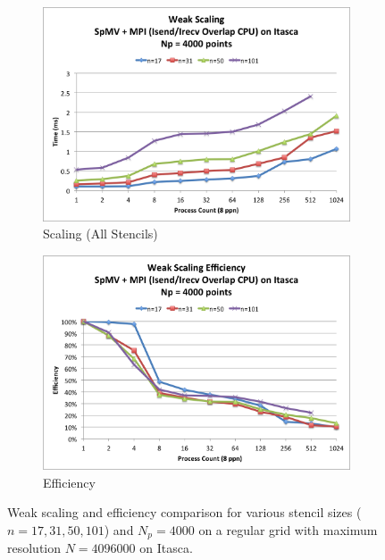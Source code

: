 \documentclass{report}
\begin{document}
\begin{figure}
\centering
\begin{subfigure}{0.6\textwidth}
\centering
\includegraphics[width=\textwidth]{performance_content/scaling/weak_scaling_np4000_overlap_cpu_SpMV_and_comm_all_stencils.png}
\caption{Scaling (All Stencils)}
\label{fig:compare_weak_scaling_all_stencils}
\end{subfigure}
\begin{subfigure}{0.6\textwidth}
\centering
\includegraphics[width=\textwidth]{performance_content/scaling/weak_scaling_efficiency_np4000_overlap_cpu_SpMV_and_comm_all_stencils.png}
\caption{Efficiency}
\label{fig:compare_weak_scaling_efficiency_all_stencils}
\end{subfigure}
\caption{Weak scaling and efficiency comparison for various stencil sizes ($n=17, 31, 50, 101$) and $N_p = 4000$ on a regular grid with maximum resolution $N=4096000$ on Itasca. } 
\label{fig:weak_scaling_all_stencils}
\end{figure}
\end{document}
